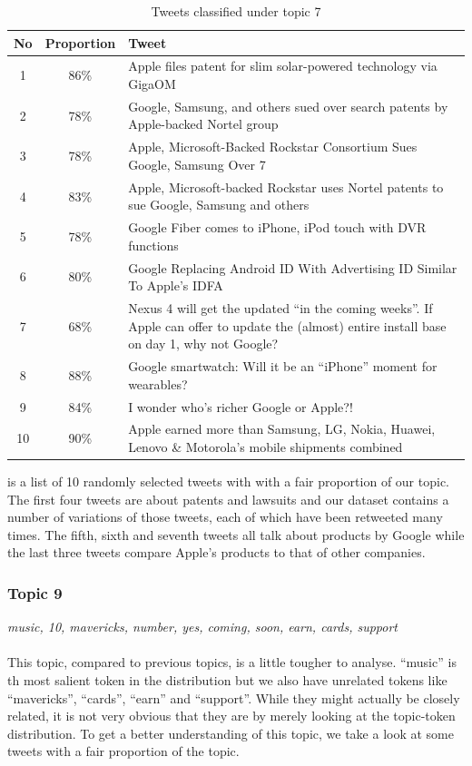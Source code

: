 \begin{table}[H]
  \begin{tabular}{c c p{13cm}} \toprule
    No  & Proportion & Tweet \\ \midrule
    1   & 86\%       & Apple files patent for slim solar-powered technology via GigaOM \\ \midrule
    2   & 78\%       & Google, Samsung, and others sued over search patents by Apple-backed Nortel group \\ \midrule
    3   & 78\%       & Apple, Microsoft-Backed Rockstar Consortium Sues Google, Samsung Over 7 \\ \midrule
    4   & 83\%       & Apple, Microsoft-backed Rockstar uses Nortel patents to sue Google, Samsung and others \\ \midrule
    5   & 78\%       & Google Fiber comes to iPhone, iPod touch with DVR functions \\ \midrule
    6   & 80\%       & Google Replacing Android ID With Advertising ID Similar To Apple's IDFA \\ \midrule
    7   & 68\%       & Nexus 4 will get the updated ``in the coming weeks''. If Apple can offer to update the (almost) entire install base on day 1, why not Google? \\ \midrule
    8   & 88\%       & Google smartwatch: Will it be an ``iPhone'' moment for wearables? \\ \midrule
    9   & 84\%       & I wonder who's richer Google or Apple?! \\ \midrule
    10  & 90\%       & Apple earned more than Samsung, LG, Nokia, Huawei, Lenovo \& Motorola's mobile shipments combined \\ \bottomrule
  \end{tabular}
  \caption{Tweets classified under topic 7}
  \label{tab:topic-7-tweets}
\end{table}

 is a list of 10 randomly selected tweets with with a fair proportion
of our topic. The first four tweets are about patents and lawsuits and our dataset contains a number
of variations of those tweets, each of which have been retweeted many times. The fifth, sixth and
seventh tweets all talk about products by Google while the last three tweets compare Apple's
products to that of other companies.


\subsubsection{Topic 9}
\label{sec:topic-9}
\textit{music, 10, mavericks, number, yes, coming, soon, earn, cards, support}\\\\
This topic, compared to previous topics, is a little tougher to analyse. ``music'' is th most
salient token in the distribution but we also have unrelated tokens like ``mavericks'', ``cards'',
``earn'' and ``support''. While they might actually be closely related, it is not very obvious that
they are by merely looking at the topic-token distribution. To get a better understanding of this
topic, we take a look at some tweets with a fair proportion of the topic.

